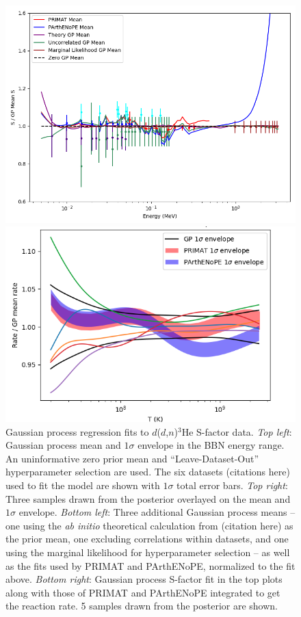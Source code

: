 \documentclass[%
 reprint,
superscriptaddress,
nofootinbib,
 amsmath,amssymb,
 aps,
 pra,
]{revtex4-2}
\begin{document}
\begin{figure}
\begin{minipage}{.48\textwidth}
		\includegraphics[width=\linewidth]{Figures/ddhe3n_S_comp.png}	
	\end{minipage}
	\hspace{0mm}
	\begin{minipage}{.48\textwidth}
    		\centering
		\includegraphics[width=\linewidth]{Figures/ddhe3n_rate.png}	
	\end{minipage}
    	\caption{Gaussian process regression fits to $d$($d$,$n$)$^3$He S-factor data. \textit{Top left}: Gaussian process mean and $1\sigma$ envelope in the BBN energy range. An uninformative zero prior mean and ``Leave-Dataset-Out'' hyperparameter selection are used. The six datasets (citations here) used to fit the model are shown with $1\sigma$ total error bars. \textit{Top right}: Three samples drawn from the posterior overlayed on the mean and $1\sigma$ envelope. \textit{Bottom left}: Three additional Gaussian process means -- one using the \textit{ab initio} theoretical calculation from (citation here) as the prior mean, one excluding correlations within datasets, and one using the marginal likelihood for hyperparameter selection -- as well as the fits used by PRIMAT and PArthENoPE, normalized to the fit above. \textit{Bottom right}: Gaussian process S-factor fit in the top plots along with those of PRIMAT and PArthENoPE integrated to get the reaction rate. 5 samples drawn from the posterior are shown. }
\end{figure}
\end{document}
